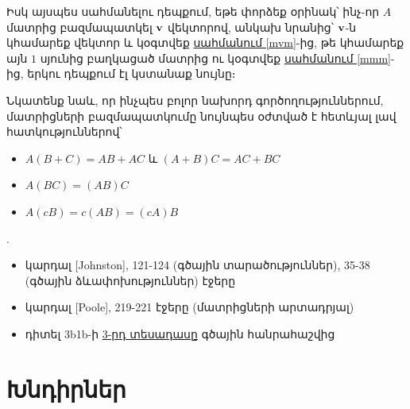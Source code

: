 Իսկ այսպես սահմանելու դեպքում, եթե փորձեք օրինակ՝ ինչ-որ $A$ մատրից բազմապատկել $\mathbf{v}$ վեկտորով, անկախ նրանից՝ $\mathbf{v}$-ն կհամարեք վեկտոր  և կօգտվեք \hyperref[mvm]{\color{OliveGreen} սահմանում \ref*{mvm}}-ից, թե կհամարեք այն $1$ սյունից բաղկացած մատրից ու կօգտվեք \hyperref[mmm]{\color{OliveGreen} սահմանում \ref*{mmm}}-ից, երկու դեպքում էլ կստանաք նույնը։

Նկատենք նաև, որ ինչպես բոլոր նախորդ գործողություններում, մատրիցների բազմապատկումը նույնպես օժտված է հետևյալ լավ հատկություններով՝
\begin{itemize}
\item $A(B + C) = AB + AC$ և  $(A + B)C = AC + BC$

\item $A(BC) = (AB)C$ 

\item $A(cB) = c(AB)=(cA)B$
\end{itemize}



\bigskip 

\begin{theory}
.
\begin{itemize}
\item կարդալ [{\rm Johnston}], 121-124 (գծային տարածություններ), 35-38 (գծային ձևափոխություններ) էջերը
\item կարդալ [{\rm Poole}], 219-221 էջերը (մատրիցների արտադրյալ)
\item դիտել  {\rm 3b1b}-ի \href{https://www.3blue1brown.com/lessons/linear-transformations}{3-րդ տեսադասը} գծային հանրահաշվից \end{itemize}
\end{theory}

\newpage

\section{Խնդիրներ}

